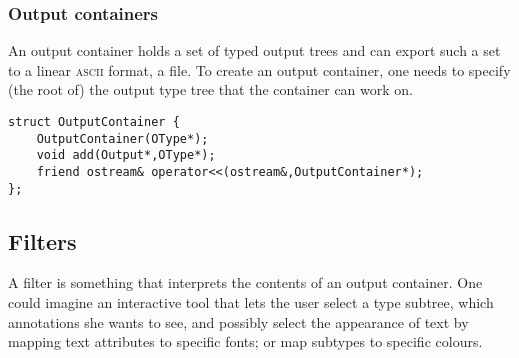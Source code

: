 \begin{docpart}
\subsubsection{Output containers}
\label{sec:outputcontainer}
An output container holds a set of typed output trees and can export
such a set to a linear \textsc{ascii} format, \eg a file. To create an
output container, one needs to specify (the root of) the output type
tree that the container can work on.

\begin{verbatim}
struct OutputContainer {
    OutputContainer(OType*);
    void add(Output*,OType*);
    friend ostream& operator<<(ostream&,OutputContainer*);
};
\end{verbatim}

\subsection{Filters}
\label{sec:filter}
A filter is something that interprets the contents of an output
container. One could imagine an interactive tool that lets the user
select a type subtree, \ie which annotations she wants to see, and
possibly select the appearance of text by mapping text attributes to
specific fonts; or map subtypes to specific colours.

\end{docpart}


